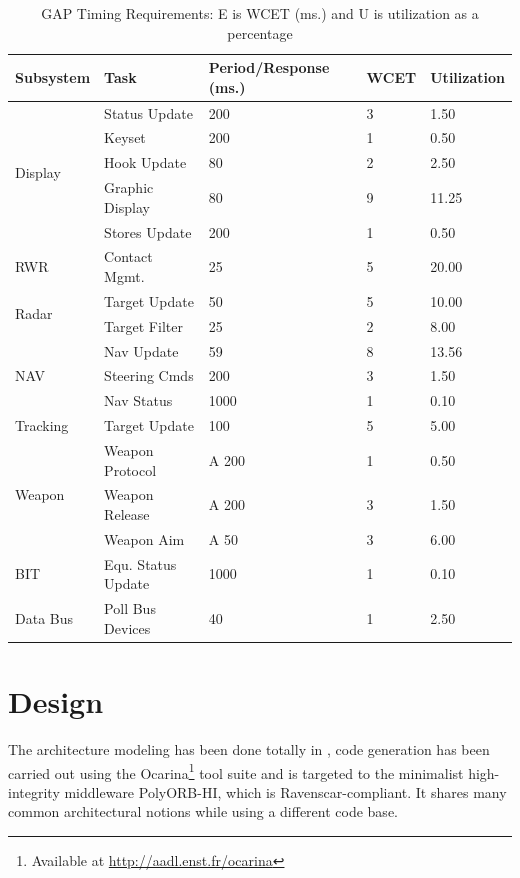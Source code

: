 \begin{table}
\centering
\begin{tabular}{|l|l|l|l|l|}
\hline
\textbf{Subsystem} & \textbf{Task} & \textbf{Period/Response (ms.)} &
  \textbf{WCET} & \textbf{Utilization}\\
\hline
\multirow{5}{*}{Display} & Status Update & 200 & 3 & 1.50\\
 & Keyset & 200 & 1 & 0.50\\
 & Hook Update & 80 & 2 & 2.50\\
 & Graphic Display & 80 & 9 & 11.25\\
 & Stores Update & 200 & 1 & 0.50\\
\hline
RWR & Contact Mgmt. & 25 & 5 & 20.00\\
\hline
\multirow{2}{*}{Radar} & Target Update & 50 & 5 & 10.00\\
 & Target Filter & 25 & 2 & 8.00\\
\hline
\multirow{3}{*}{NAV} & Nav Update & 59 & 8 & 13.56\\
 & Steering Cmds & 200 & 3 & 1.50\\
 & Nav Status & 1000 & 1 & 0.10\\
\hline
Tracking & Target Update & 100 & 5 & 5.00\\
\hline
\multirow{3}{*}{Weapon} & Weapon Protocol & A 200 & 1 & 0.50\\
 & Weapon Release & A 200 & 3 & 1.50\\
 & Weapon Aim & A 50 & 3 & 6.00\\
\hline
BIT & Equ. Status Update & 1000 & 1 & 0.10\\
\hline
Data Bus & Poll Bus Devices & 40 & 1 & 2.50\\
\hline
\end{tabular}
\caption{GAP Timing Requirements: {\normalsize E is WCET (ms.) and U is
    utilization as a percentage}}
\label{tab:GAP_timing}
\end{table}

\section{Design}
\label{design}
The architecture modeling has been done totally in \aadl, code
generation has been carried out using the Ocarina\footnote{Available
  at \url{http://aadl.enst.fr/ocarina}} tool suite and is targeted to
the minimalist high-integrity middleware PolyORB-HI, which is
Ravenscar-compliant. It shares many common architectural notions while
using a different code base.

